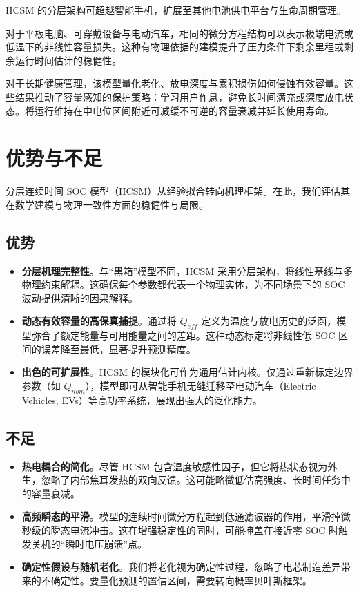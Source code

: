 \documentclass[11pt,a4paper]{ctexart}
\begin{document}
HCSM 的分层架构可超越智能手机，扩展至其他电池供电平台与生命周期管理。

对于平板电脑、可穿戴设备与电动汽车，相同的微分方程结构可以表示极端电流或低温下的非线性容量损失。这种有物理依据的建模提升了压力条件下剩余里程或剩余运行时间估计的稳健性。

对于长期健康管理，该模型量化老化、放电深度与累积损伤如何侵蚀有效容量。这些结果推动了容量感知的保护策略：学习用户作息，避免长时间满充或深度放电状态。将运行维持在中电位区间附近可减缓不可逆的容量衰减并延长使用寿命。

\section{优势与不足}

分层连续时间 SOC 模型（HCSM）从经验拟合转向机理框架。在此，我们评估其在数学建模与物理一致性方面的稳健性与局限。

\subsection{优势}

\begin{itemize}[leftmargin=2em]
\item \textbf{分层机理完整性}。与“黑箱”模型不同，HCSM 采用分层架构，将线性基线与多物理约束解耦。这确保每个参数都代表一个物理实体，为不同场景下的 SOC 波动提供清晰的因果解释。

\item \textbf{动态有效容量的高保真捕捉}。通过将 $Q_{eff}$ 定义为温度与放电历史的泛函，模型弥合了额定能量与可用能量之间的差距。这种动态标定将非线性低 SOC 区间的误差降至最低，显著提升预测精度。

\item \textbf{出色的可扩展性}。HCSM 的模块化可作为通用估计内核。仅通过重新标定边界参数（如 $Q_{nom}$），模型即可从智能手机无缝迁移至电动汽车（Electric Vehicles, EVs）等高功率系统，展现出强大的泛化能力。
\end{itemize}

\subsection{不足}

\begin{itemize}[leftmargin=2em]
\item \textbf{热电耦合的简化}。尽管 HCSM 包含温度敏感性因子，但它将热状态视为外生，忽略了内部焦耳发热的双向反馈。这可能略微低估高强度、长时间任务中的容量衰减。

\item \textbf{高频瞬态的平滑}。模型的连续时间微分方程起到低通滤波器的作用，平滑掉微秒级的瞬态电流冲击。这在增强稳定性的同时，可能掩盖在接近零 SOC 时触发关机的“瞬时电压崩溃”点。

\item \textbf{确定性假设与随机老化}。我们将老化视为确定性过程，忽略了电芯制造差异带来的不确定性。要量化预测的置信区间，需要转向概率贝叶斯框架。
\end{itemize}
\end{document}
